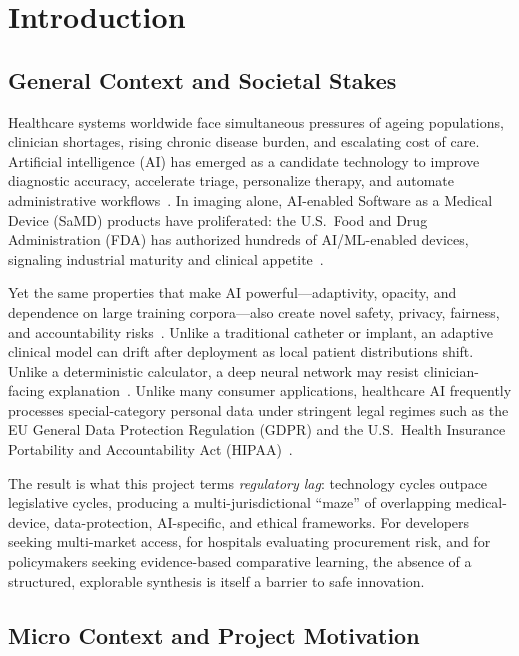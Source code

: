 \chapter{Introduction}
\label{ch:intro}

\section{General Context and Societal Stakes}
\label{sec:macro}

Healthcare systems worldwide face simultaneous pressures of ageing populations, clinician shortages, rising chronic disease burden, and escalating cost of care. Artificial intelligence (AI) has emerged as a candidate technology to improve diagnostic accuracy, accelerate triage, personalize therapy, and automate administrative workflows~\cite{topol2019,rajpurkar2022}. In imaging alone, AI-enabled Software as a Medical Device (SaMD) products have proliferated: the U.S.\ Food and Drug Administration (FDA) has authorized hundreds of AI/ML-enabled devices, signaling industrial maturity and clinical appetite~\cite{wu2021,fda2021}.

Yet the same properties that make AI powerful---adaptivity, opacity, and dependence on large training corpora---also create novel safety, privacy, fairness, and accountability risks~\cite{gerke2020,char2018}. Unlike a traditional catheter or implant, an adaptive clinical model can drift after deployment as local patient distributions shift. Unlike a deterministic calculator, a deep neural network may resist clinician-facing explanation~\cite{ghassemi2021,rudin2019}. Unlike many consumer applications, healthcare AI frequently processes special-category personal data under stringent legal regimes such as the EU General Data Protection Regulation (GDPR) and the U.S.\ Health Insurance Portability and Accountability Act (HIPAA)~\cite{cohen2018,goodman2017}.

The result is what this project terms \emph{regulatory lag}: technology cycles outpace legislative cycles, producing a multi-jurisdictional ``maze'' of overlapping medical-device, data-protection, AI-specific, and ethical frameworks. For developers seeking multi-market access, for hospitals evaluating procurement risk, and for policymakers seeking evidence-based comparative learning, the absence of a structured, explorable synthesis is itself a barrier to safe innovation.

\section{Micro Context and Project Motivation}
\label{sec:micro}

